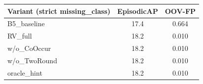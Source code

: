 \begin{tabular}{lcc}
\toprule
Variant (strict missing\_class) & EpisodicAP & OOV-FP \\
\midrule
B5_baseline & 17.4 & 0.664 \\
RV_full & 18.2 & 0.010 \\
w/o_CoOccur & 18.2 & 0.010 \\
w/o_TwoRound & 18.2 & 0.010 \\
oracle_hint & 18.2 & 0.010 \\
\bottomrule
\end{tabular}
